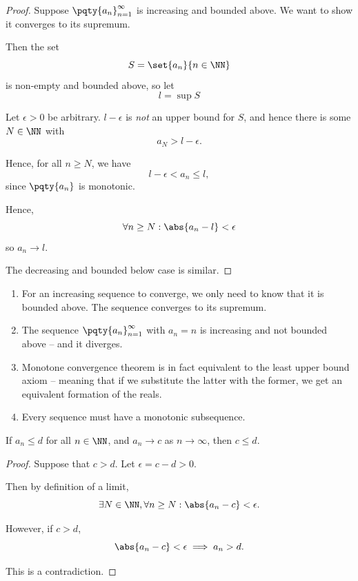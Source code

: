 \begin{proof}
    Suppose \(\pqty{a_n}_{n = 1}^{\infty}\) is increasing and bounded above. We want to show it converges to its supremum.

    Then the set
    \[
        S = \set{a_n}{n \in \NN}
    \]
    is non-empty and bounded above, so let
    \[
        l = \sup S
    \]

    Let \(\epsilon > 0\) be arbitrary. \(l - \epsilon\) is \emph{not} an upper bound for \(S\), and hence there is some \(N \in \NN\) with
    \[
        a_N > l - \epsilon.
    \]

    Hence, for all \(n \geq N\), we have
    \[
        l - \epsilon < a_n \leq l,
    \]
    since \(\pqty{a_n}\) is monotonic.

    Hence,
    \[
        \forall n \geq N: \abs{a_n - l} < \epsilon
    \]
    so \(a_n \to l\).

    The decreasing and bounded below case is similar.
\end{proof}

\begin{remarks}
    \begin{enumerate}
        \item For an increasing sequence to converge, we only need to know that it is bounded above. The sequence converges to its supremum.
        \item The sequence \(\pqty{a_n}_{n = 1}^{\infty}\) with \(a_n = n\) is increasing and not bounded above -- and it diverges.
        \item Monotone convergence theorem is in fact equivalent to the least upper bound axiom -- meaning that if we substitute the latter with the former, we get an equivalent formation of the reals.
        \item Every sequence must have a monotonic subsequence.
    \end{enumerate}
\end{remarks}

\begin{proposition}
    If \(a_n \leq d\) for all \(n \in \NN\), and \(a_n \to c\) as \(n \to \infty\), then \(c \leq d\).
\end{proposition}

\begin{proof}
    Suppose that \(c > d\). Let \(\epsilon = c - d > 0\).

    Then by definition of a limit,
    \[
        \exists N \in \NN, \forall n \geq N: \abs{a_n - c} < \epsilon.
    \]

    However, if \(c > d\),
    \[
        \abs{a_n - c} < \epsilon \implies a_n > d.
    \]

    This is a contradiction.
\end{proof}

